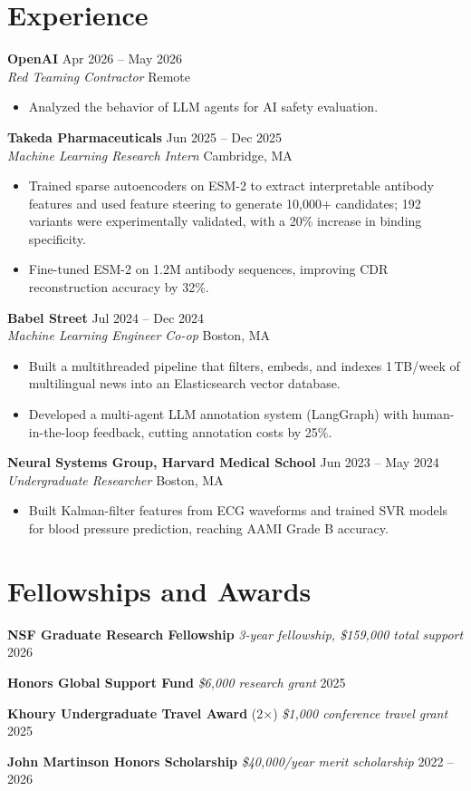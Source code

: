 \documentclass[11pt,letterpaper]{article}
\newcommand{\entry}[4]{%
  \textbf{#1} \hfill #2\\
  \textit{#3} \hfill {\small #4}\par}
\newcommand{\oneline}[2]{#1 \hfill #2\par}
\newcommand{\gap}{\vspace{6pt}}
\begin{document}
\section{Experience}
\entry{OpenAI}{Apr 2026 -- May 2026}{Red Teaming Contractor}{Remote}
\begin{itemize}
  \item Analyzed the behavior of LLM agents for AI safety evaluation.
\end{itemize}
\gap

\entry{Takeda Pharmaceuticals}{Jun 2025 -- Dec 2025}{Machine Learning Research Intern}{Cambridge, MA}
\begin{itemize}
  \item Trained sparse autoencoders on ESM-2 to extract interpretable antibody features and used feature steering to generate
        10,000+ candidates; 192 variants were experimentally validated, with a 20\% increase in binding specificity.
  \item Fine-tuned ESM-2 on 1.2M antibody sequences, improving CDR reconstruction accuracy by 32\%.
\end{itemize}
\gap

\entry{Babel Street}{Jul 2024 -- Dec 2024}{Machine Learning Engineer Co-op}{Boston, MA}
\begin{itemize}
  \item Built a multithreaded pipeline that filters, embeds, and indexes 1\,TB/week of multilingual news into an
        Elasticsearch vector database.
  \item Developed a multi-agent LLM annotation system (LangGraph) with human-in-the-loop feedback, cutting annotation
        costs by 25\%.
\end{itemize}
\gap

\entry{Neural Systems Group, Harvard Medical School}{Jun 2023 -- May 2024}{Undergraduate Researcher}{Boston, MA}
\begin{itemize}
  \item Built Kalman-filter features from ECG waveforms and trained SVR models for blood pressure prediction, reaching
        AAMI Grade B accuracy.
\end{itemize}

\section{Fellowships and Awards}
\oneline{\textbf{NSF Graduate Research Fellowship} \quad \textit{3-year fellowship, \$159,000 total support}}{2026}
\oneline{\textbf{Honors Global Support Fund} \quad \textit{\$6,000 research grant}}{2025}
\oneline{\textbf{Khoury Undergraduate Travel Award} (2$\times$) \quad \textit{\$1,000 conference travel grant}}{2025}
\oneline{\textbf{John Martinson Honors Scholarship} \quad \textit{\$40,000/year merit scholarship}}{2022 -- 2026}
\end{document}
